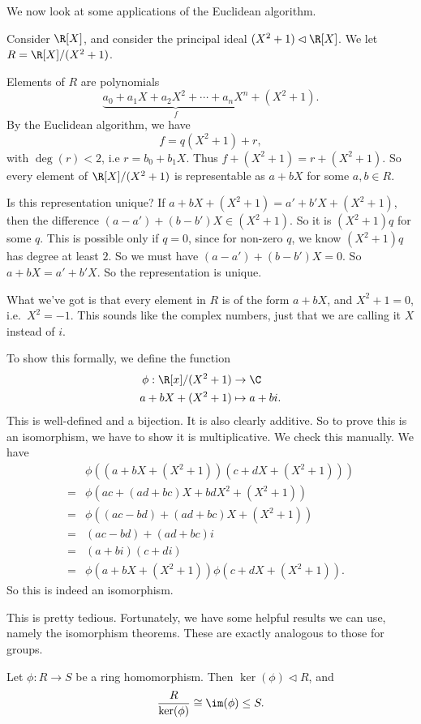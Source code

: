 \documentclass[a4paper]{article}
\begin{document}
We now look at some applications of the Euclidean algorithm.
\begin{eg}
  Consider $\R[X]$, and consider the principal ideal $(X^2 + 1) \lhd \R[X]$. We let $R = \R[X]/(X^2 + 1)$.

  Elements of $R$ are polynomials
  \[
    \underbrace{a_0 + a_1X + a_2 X^2 + \cdots + a_n X^n}_{f} + (X^2 + 1).
  \]
  By the Euclidean algorithm, we have
  \[
    f = q(X^2 + 1) + r,
  \]
  with $\deg(r) < 2$, i.e $r = b_0 + b_1 X$. Thus $f + (X^2 + 1) = r + (X^2 + 1)$. So every element of $\R[X]/(X^2 + 1)$ is representable as $a + bX$ for some $a, b \in R$.

  Is this representation unique? If $a + bX + (X^2 + 1) = a' + b' X + (X^2 + 1)$, then the difference $(a - a') + (b - b')X \in (X^2 + 1)$. So it is $(X^2 + 1)q$ for some $q$. This is possible only if $q = 0$, since for non-zero $q$, we know $(X^2 + 1)q$ has degree at least $2$. So we must have $(a - a') + (b - b')X = 0$. So $a + bX = a' + b'X$. So the representation is unique.

  What we've got is that every element in $R$ is of the form $a + bX$, and $X^2 + 1 = 0$, i.e.\ $X^2 = -1$. This sounds like the complex numbers, just that we are calling it $X$ instead of $i$.

  To show this formally, we define the function
  \begin{align*}
    \phi: \R[x]/(X^2 + 1) &\to \C\\
    a + bX + (X^2 + 1) & \mapsto a + bi.
  \end{align*}
  This is well-defined and a bijection. It is also clearly additive. So to prove this is an isomorphism, we have to show it is multiplicative. We check this manually. We have
  \begin{align*}
    &\phi((a + bX + (X^2 + 1))(c + dX + (X^2 + 1))) \\
    ={}& \phi(ac + (ad + bc)X + bdX^2 + (X^2 + 1))\\
    ={}& \phi((ac - bd) + (ad + bc)X + (X^2 + 1))\\
    ={}& (ac - bd) + (ad + bc)i\\
    ={}& (a + bi) (c + di)\\
    ={}& \phi(a + bX + (X^2 + 1))\phi(c + dX + (X^2 + 1)).
  \end{align*}
  So this is indeed an isomorphism.
\end{eg}

This is pretty tedious. Fortunately, we have some helpful results we can use, namely the isomorphism theorems. These are exactly analogous to those for groups.
\begin{thm}
  Let $\phi: R \to S$ be a ring homomorphism. Then $\ker (\phi) \lhd R$, and
  \[
    \frac{R}{\ker (\phi)} \cong \im(\phi) \leq S.
  \]
\end{thm}
\end{document}

